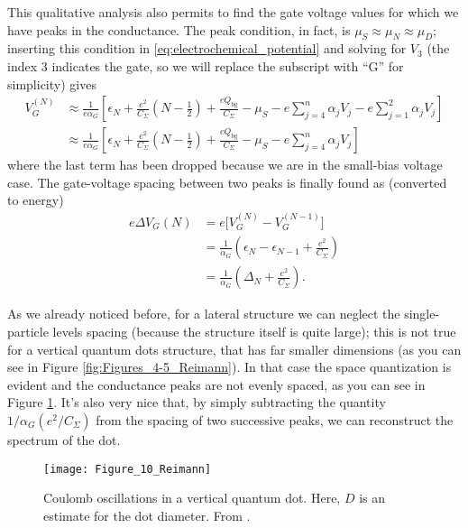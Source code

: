 This qualitative analysis also permits to find the gate voltage values for which we have peaks in the conductance. The peak condition, in fact, is $\mu_S\approx\mu_N\approx\mu_D$; inserting this condition in \eqref{eq:electrochemical_potential} and solving for $V_3$ (the index 3 indicates the gate, so we will replace the subscript with ``G'' for simplicity) gives
\begin{align}
	V_G^{(N)}
	&\approx \frac{1}{e\alpha_G}\left[ \epsilon_N + \frac{e^2}{C_{\Sigma}}\left(N-\frac{1}{2}\right) + \frac{eQ_{\text{bg}}}{C_{\Sigma}} - \mu_S - e\sum_{j=4}^{n}\alpha_jV_j - e\sum_{j=1}^{2}\alpha_jV_j \right] \\
	&\approx \frac{1}{e\alpha_G}\left[ \epsilon_N + \frac{e^2}{C_{\Sigma}}\left(N-\frac{1}{2}\right) + \frac{eQ_{\text{bg}}}{C_{\Sigma}} - \mu_S - e\sum_{j=4}^{n}\alpha_jV_j \right]
\end{align}
where the last term has been dropped because we are in the small-bias voltage case. The gate-voltage spacing between two peaks is finally found as (converted to energy)
\begin{align}
	e\Delta V_G(N) 
	&= e\Big[V_G^{(N)}-V_G^{(N-1)}\Big] \\
	&= \frac{1}{\alpha_G}\left( \epsilon_N - \epsilon_{N-1} + \frac{e^2}{C_{\Sigma}} \right) \\
	&= \frac{1}{\alpha_G}\left( \Delta_N + \frac{e^2}{C_{\Sigma}} \right).
	\label{eq:DeltaVG_N_Vb0}
\end{align}

As we already noticed before, for a lateral structure we can neglect the single-particle levels spacing (because the structure itself is quite large); this is not true for a vertical quantum dots structure, that has far smaller dimensions (as you can see in Figure \ref{fig:Figures_4-5_Reimann}). In that case the space quantization is evident and the conductance peaks are not evenly spaced, as you can see in Figure \ref{fig:Figure_10_Reimann}. It's also very nice that, by simply subtracting the quantity $1 / \alpha_G (e^2 / C_{\Sigma})$ from the spacing of two successive peaks, we can reconstruct the spectrum of the dot.

\begin{figure}[h]%
	\centering
    \texttt{[image: Figure\_10\_Reimann]}
    \caption{Coulomb oscillations in a vertical quantum dot. Here, $D$ is an estimate for the dot diameter. From \cite{Tarucha1996}.}
	\label{fig:Figure_10_Reimann}
\end{figure}

